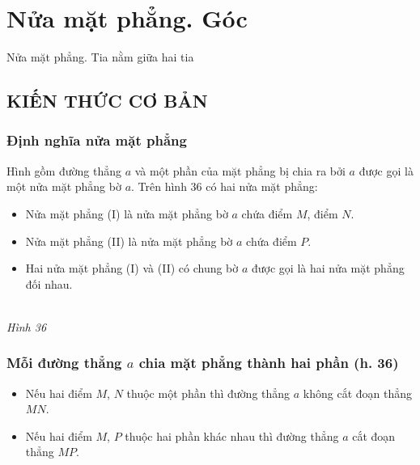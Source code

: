 
\section{Nửa mặt phẳng. Góc }
\begin{dang}{Nửa mặt phẳng. Tia nằm giữa hai tia}
\end{dang}

\subsection{KIẾN THỨC CƠ BẢN}
\subsubsection{Định nghĩa nửa mặt phẳng}
Hình gồm đường thẳng $a$ và một phần của mặt phẳng bị chia ra bởi $a$ được gọi là một nửa mặt phẳng bờ $a$.  Trên hình $36$ có hai nửa mặt phẳng:
\begin{itemize}
	\item Nửa mặt phẳng (I) là nửa mặt phẳng bờ $a$ chứa điểm $M$, điểm $N$.
	\item Nửa mặt phẳng (II) là nửa mặt phẳng bờ $a$ chứa điểm $P$.
	\item Hai nửa mặt phẳng (I) và (II) có chung bờ $a$ được gọi là hai nửa mặt phẳng đối nhau.
\end{itemize}
\begin{center}
	\\
\centering \textit{Hình 36}
\end{center}
\subsubsection{ Mỗi đường thẳng $a$ chia mặt phẳng thành hai phần (h. 36)}
\begin{itemize}
	\item Nếu hai điểm $M$, $N$ thuộc một phần thì đường thẳng $a$ không cắt đoạn thẳng $MN$.
	\item Nếu hai điểm $M$, $P$ thuộc hai phần khác nhau thì đường thẳng $a$ cắt đoạn thẳng $MP$.
	\end{itemize}

